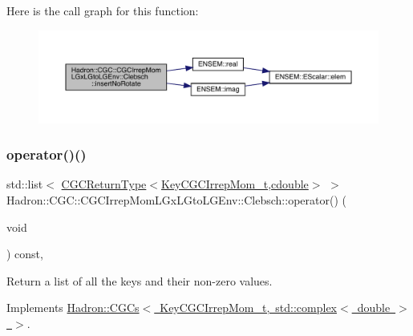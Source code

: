 Here is the call graph for this function\+:\nopagebreak
\begin{figure}[H]
\begin{center}
\leavevmode
\includegraphics[width=350pt]{d1/d39/classHadron_1_1CGC_1_1CGCIrrepMomLGxLGtoLGEnv_1_1Clebsch_a57c67efaf6fb826157a5c19a4066959e_cgraph}
\end{center}
\end{figure}
\mbox{\label{classHadron_1_1CGC_1_1CGCIrrepMomLGxLGtoLGEnv_1_1Clebsch_a27a81332c929b1f421704680e794b796}} 
\subsubsection{\texorpdfstring{operator()()}{operator()()}\hspace{0.1cm}{\footnotesize\ttfamily [1/2]}}
{\footnotesize\ttfamily std\+::list$<$ \mbox{\hyperlink{structHadron_1_1CGCReturnType}{C\+G\+C\+Return\+Type}}$<$\mbox{\hyperlink{structHadron_1_1KeyCGCIrrepMom__t}{Key\+C\+G\+C\+Irrep\+Mom\+\_\+t}},\mbox{\hyperlink{namespaceHadron_1_1CGC_a52d2b70e6792726fb525eab94daae53b}{cdouble}}$>$ $>$ Hadron\+::\+C\+G\+C\+::\+C\+G\+C\+Irrep\+Mom\+L\+Gx\+L\+Gto\+L\+G\+Env\+::\+Clebsch\+::operator() (\begin{DoxyParamCaption}\item[{void}]{ }\end{DoxyParamCaption}) const\hspace{0.3cm}{\ttfamily [inline]}, {\ttfamily [virtual]}}



Return a list of all the keys and their non-\/zero values. 



Implements \mbox{\hyperlink{classHadron_1_1CGCs_ac709374b31c0319e82028b9d7c23e993}{Hadron\+::\+C\+G\+Cs$<$ Key\+C\+G\+C\+Irrep\+Mom\+\_\+t, std\+::complex$<$ double $>$ $>$}}.

